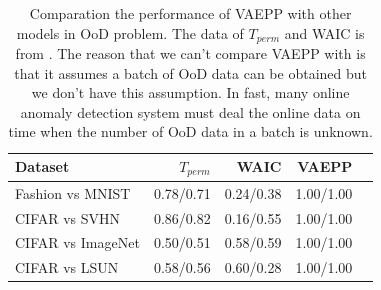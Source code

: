 \begin{table}[tb]
\centering
\begin{tabular}{lrrrr}  
\toprule
Dataset  &  $T_{perm}$ & WAIC & VAEPP\\
\midrule
Fashion vs MNIST  & 0.78/0.71  & 0.24/0.38 & 1.00/1.00  \\
CIFAR vs SVHN     & 0.86/0.82  & 0.16/0.55 & 1.00/1.00  \\
CIFAR vs ImageNet & 0.50/0.51  & 0.58/0.59 & 1.00/1.00  \\
CIFAR vs LSUN     & 0.58/0.56  & 0.60/0.28 & 1.00/1.00  \\
\bottomrule
\end{tabular}
\caption{Comparation the performance of VAEPP with other models in OoD problem. The data of $T_{perm}$ and WAIC is from \protect \cite{song2019unsupervised}. The reason that we can't compare VAEPP with \protect\cite{song2019unsupervised} is that it assumes a batch of OoD data can be obtained but we don't have this assumption. In fast, many online anomaly detection system must deal the online data on time when the number of OoD data in a batch is unknown. }
\label{tab:compare_ood_other_datasets}
\end{table}

